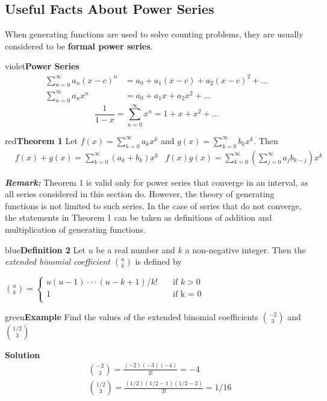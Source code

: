 \documentclass[11pt]{article}
\newenvironment{example}[1][\unskip]{\begin{mybox}{green}{\textbf{Example} {#1}}}{\end{mybox}}
\newenvironment{definition}[1]{\begin{mybox}{blue}{\textbf{Definition #1}}}{\end{mybox}}
\newenvironment{theorem}[1]{\begin{mybox}{red}{\textbf{Theorem #1}}}{\end{mybox}}
\begin{document}
\subsection{Useful Facts About Power Series}
When generating functions are used to solve counting problems, they are usually considered to be \textbf{formal power series}.

\begin{mybox}{violet}{\textbf{Power Series}}
\begin{align*}
    \sum_{n=0}^{\infty} a_n(x-c)^n &= a_0 + a_1(x-c) + a_2(x-c)^2 + ...\\
    \sum_{n=0}^{\infty} a_nx^n &= a_0 + a_1x + a_2x^2 + ...
\end{align*}
\begin{equation*}
    \frac{1}{1-x} = \sum_{n=0}^{\infty} x^n = 1 + x + x^2 + ...
\end{equation*}
\end{mybox}

\begin{theorem}{1}
Let $f(x) = \sum_{k=0}^{\infty} a_kx^k$ and $g(x) = \sum_{k=0}^{\infty} b_kx^k$. Then
\begin{align*}
    &f(x) + g(x) = \sum_{k=0}^{\infty} (a_k + b_k)x^k &f(x)g(x) = \sum_{k=0}^{\infty} \left( \sum_{j=0}^{\infty} a_jb_{k-j} \right) x^k
\end{align*}
\end{theorem}
\textbf{\textit{Remark:}} Theorem 1 is valid only for power series that converge in an interval, as all series considered in this section do. However, the theory of generating functions is not limited to such series. In the case of series that do not converge, the statements in Theorem 1 can be taken as definitions of addition and multiplication of generating functions.


\begin{definition}{2}
Let $u$ be a real number and $k$ a non-negative integer. Then the \textit{extended binomial coefficient $\binom uk$} is defined by

$\binom uk = 
    \begin{cases}
       u (u-1) \cdot \cdot \cdot (u-k+1)/k! &\quad\text{if } k > 0\\
       1 &\quad\text{if k = 0}\\
    \end{cases}$
\end{definition}

\begin{example}
Find the values of the extended binomial coefficients $\binom{-2}{3}$ and $\binom{1/2}{3}$

\textbf{Solution}
\begin{align*}
&\binom{-2}{3} = \frac{(-2)(-3)(-4)}{3!} = -4\\
&\binom{1/2}{3} = \frac{(1/2)(1/2-1)(1/2-2)}{3!} = 1/16        
\end{align*}
\end{example}
\end{document}
